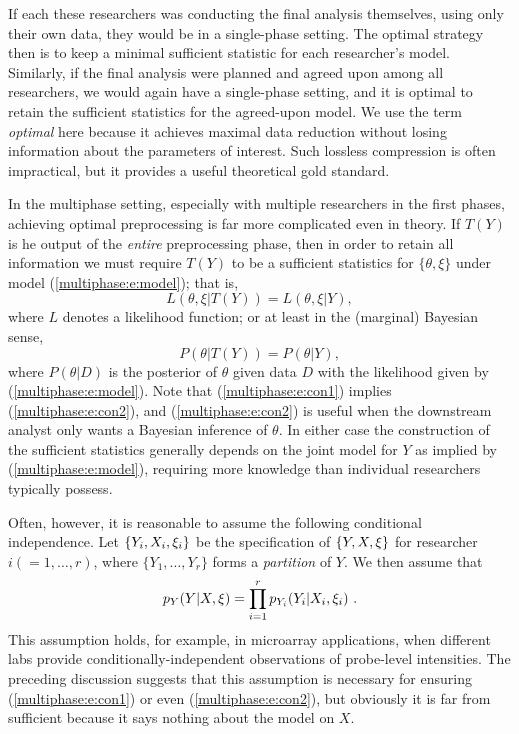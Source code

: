 If each these researchers was conducting the final analysis themselves, using only their own data, they would be in a single-phase setting.
The optimal strategy then is  to keep a minimal sufficient statistic for each researcher's model. 
 Similarly, if the final analysis were planned and agreed upon among all researchers, we would again have a single-phase setting,  and  it is optimal to retain the sufficient statistics for the agreed-upon model. We use the term \textit{optimal} here because it achieves maximal data reduction without losing information about the parameters of interest. Such lossless compression is often impractical, but it provides a useful theoretical gold standard.%

In the multiphase setting, especially with multiple researchers in the first phases, achieving optimal preprocessing is far more complicated even in theory.
If $T(Y)$ is  he output of the \textit{entire} preprocessing phase, then in order to retain all information we must require $T(Y)$ to be a sufficient statistics for $\{\theta,\xi\}$ under model (\ref{multiphase:e:model}); that is, 
\begin{equation}\label{multiphase:e:con1}  
L(\theta,\xi|T(Y))=L(\theta,\xi|Y),
\end{equation}
where $L$ denotes a likelihood function;  or at least in the (marginal) Bayesian sense,
\begin{equation}\label{multiphase:e:con2}
P(\theta|T(Y))=P(\theta|Y),
\end{equation}
where $P(\theta|D)$ is the posterior of $\theta$ given data $D$ with the likelihood given by  (\ref{multiphase:e:model}).  Note  that (\ref{multiphase:e:con1}) implies (\ref{multiphase:e:con2}), and (\ref{multiphase:e:con2}) is useful when the downstream analyst only wants a Bayesian inference of $\theta$. In either case the construction of the sufficient statistics  generally depends on the joint model for $Y$ as implied by (\ref{multiphase:e:model}), requiring more knowledge than individual researchers typically possess.

Often, however, it is reasonable to assume the following conditional independence.
Let $\{Y_i, X_i, \xi_i\}$ be the specification of $\{Y, X, \xi\}$ for researcher $i(=1,\ldots, r)$, where $\{Y_1,\ldots, Y_r\}$ forms a \textit{partition} of $Y$.  We then assume that
\begin{equation}\label{multiphase:e:obsm}
 \pobs(Y | X, \obsparam) = \prod_{i=1}^r p_{Y_i}(Y_i | X_i, \obsparam_i)\ .
\end{equation}
This assumption holds, for example, in microarray applications, when different labs provide conditionally-independent observations of probe-level intensities. The preceding discussion suggests that this assumption is necessary for ensuring (\ref{multiphase:e:con1}) or even (\ref{multiphase:e:con2}), but obviously it is far from sufficient because it says nothing about the model on $X$. 

